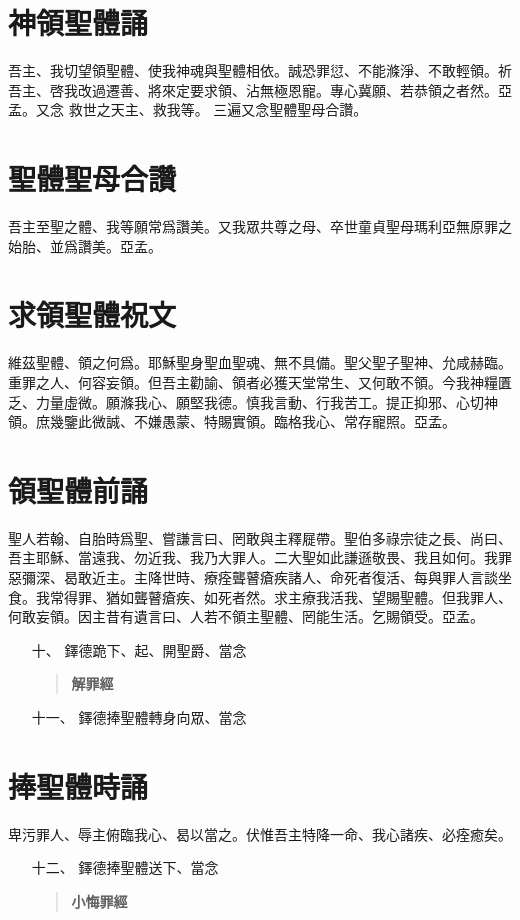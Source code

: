 \section*{神領聖體誦}
吾主、我切望領聖體、使我神魂與聖體相依。誠恐罪愆、不能滌淨、不敢輕領。祈吾主、啓我改過遷善、將來定要求領、沾無極恩寵。專心冀願、若恭領之者然。{\cspace}亞孟。{\small 又念}
救世之天主、救我等。 {\small 三遍又念聖體聖母合讚。}
\section*{聖體聖母合讚}
吾主至聖之體、我等願常爲讚美。又我眾共尊之母、卒世童貞聖母瑪利亞無原罪之始胎、並爲讚美。{\cspace}亞孟。
\section*{求領聖體祝文}
維茲聖體、領之何爲。耶穌聖身聖血聖魂、無不具備。聖父聖子聖神、允咸赫臨。重罪之人、何容妄領。但吾主勸諭、領者必獲天堂常生、又何敢不領。今我神糧匱乏、力量虛微。願滌我心、願堅我德。慎我言動、行我苦工。提正抑邪、心切神領。庶幾鑒此微誠、不嫌愚蒙、特賜實領。臨格我心、常存寵照。{\cspace}亞孟。
\section*{領聖體前誦}
聖人若翰、自胎時爲聖、嘗謙言曰、罔敢與主釋屣帶。聖伯多祿宗徒之長、尚曰、吾主耶穌、當遠我、勿近我、我乃大罪人。二大聖如此謙遜敬畏、我且如何。我罪惡彌深、曷敢近主。主降世時、療痊聾瞽瘡疾諸人、命死者復活、每與罪人言談坐食。我常得罪、猶如聾瞽瘡疾、如死者然。求主療我活我、望賜聖體。但我罪人、何敢妄領。因主昔有遺言曰、人若不領主聖體、罔能生活。乞賜領受。{\cspace}亞孟。
\begin{enumerate}
    \item[十、]{\small 鐸德跪下、起、開聖爵、當念}
    \begin{quote}\bfseries 解罪經\end{quote}
    \item[十一、]{\small 鐸德捧聖體轉身向眾、當念}
\end{enumerate}
\section*{捧聖體時誦}
卑污罪人、辱主俯臨我心、曷以當之。伏惟吾主特降一命、我心諸疾、必痊癒矣。
\begin{enumerate}
    \item[十二、]{\small 鐸德捧聖體送下、當念}
    \begin{quote}\bfseries 小悔罪經\end{quote}
\end{enumerate}
